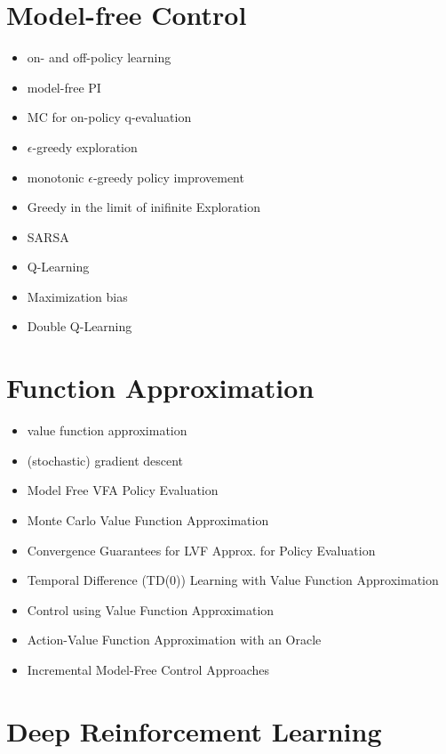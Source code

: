 \documentclass[]{article}
\begin{document}
\section{Model-free Control}

\begin{itemize}
\itemsep-0.5em
    \item on- and off-policy learning
    \item model-free PI
    \item MC for on-policy q-evaluation
    \item $\epsilon$-greedy exploration
    \item monotonic $\epsilon$-greedy policy improvement
    \item Greedy in the limit of inifinite Exploration
    \item SARSA
    \item Q-Learning
    \item Maximization bias
    \item Double Q-Learning
\end{itemize}

\section{Function Approximation}

\begin{itemize}
\itemsep-0.5em
    \item value function approximation
    \item (stochastic) gradient descent
    \item Model Free VFA Policy Evaluation
    \item Monte Carlo Value Function Approximation
    \item Convergence Guarantees for LVF Approx. for Policy Evaluation
    \item Temporal Difference (TD(0)) Learning with Value Function Approximation
    \item Control using Value Function Approximation
    \item Action-Value Function Approximation with an Oracle
    \item Incremental Model-Free Control Approaches
\end{itemize}

\section{Deep Reinforcement Learning}
\end{document}
